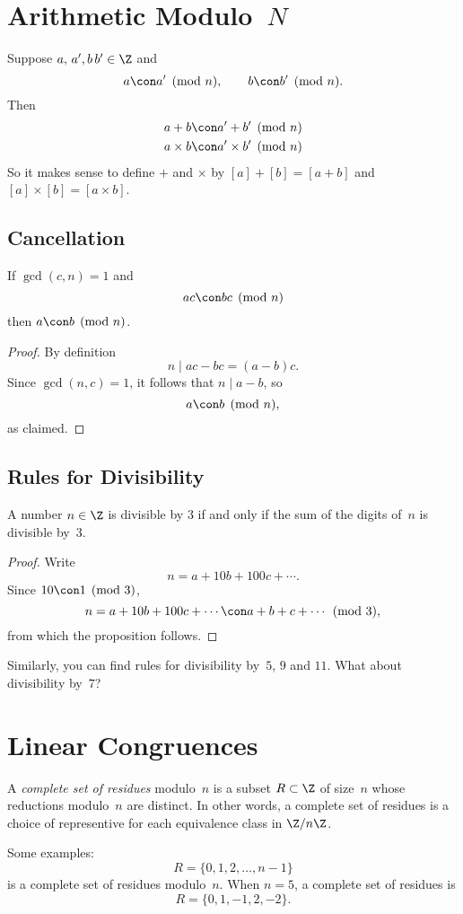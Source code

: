 \documentclass[11pt]{report}
\begin{document}
\section{Arithmetic Modulo~$N$}
Suppose $a,\,a',b\,b'\in\Z$ and
$$
  a\con a'\pmod{n}, \qquad b\con b'\pmod{n}.
$$
Then
\begin{align}
  a + b     & \con a' + b'\pmod{n}     \\
  a\times b & \con a'\times b'\pmod{n}
\end{align}
So it makes sense to define $+$ and $\times$ by
$[a]+[b]=[a+b]$ and $[a]\times[b]=[a\times b]$.

\subsection{Cancellation}
\begin{proposition}\label{prop:cancel}
  If $\gcd(c,n)=1$ and
  $$
    ac\con bc\pmod{n}
  $$
  then $a \con b\pmod{n}$.
\end{proposition}
\begin{proof}
  By definition
  $$
    n \mid ac - bc = (a-b)c.
  $$
  Since $\gcd(n,c)=1$, it follows that $n\mid a-b$, so
  $$
    a \con b\pmod{n},
  $$
  as claimed.
\end{proof}

\subsection{Rules for Divisibility}
\begin{proposition}
  A number $n\in\Z$ is divisible by $3$ if and only if
  the sum of the digits of~$n$ is divisible by~$3$.
\end{proposition}
\begin{proof}
  Write
  $$n=a+10b+100c+\cdots.$$
  Since $10\con 1\pmod{3}$,
  $$
    n = a + 10b + 100c+\cdots \con a + b + c+\cdots \pmod{3},
  $$
  from which the proposition follows.
\end{proof}

Similarly, you can find rules for divisibility by~$5$, $9$ and $11$.
What about divisibility by~$7$?


\section{Linear Congruences}
\begin{definition}
  A {\em complete set of residues} modulo~$n$ is a subset $R\subset\Z$
  of size~$n$ whose reductions modulo~$n$ are distinct.  In other words,
  a complete set of residues is a choice of representive for each
  equivalence class in $\Z/n\Z$.
\end{definition}
Some examples:
$$
  R=\{0,1,2,\ldots,n-1\}
$$
is a complete set of residues modulo~$n$.
When $n=5$, a complete set of residues is
$$
  R = \{0,1,-1,2,-2\}.
$$
\end{document}
